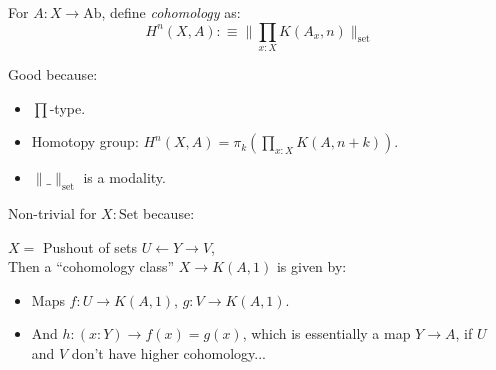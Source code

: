 \documentclass{beamer}
\begin{document}
\begin{frame}
  \vspace{0.25cm}
  For $A : X \to \mathrm{Ab}$, define \emph{cohomology} as:
  \[ H^n(X, A) :\equiv \Big\| \prod_{x:X}K(A_x,n) \Big\|_{\mathrm{set}} \]
  
  \pause
  Good because:
  \begin{itemize}
  \item $\prod$-type.
  \item Homotopy group: $H^n(X,A)=\pi_{k}(\prod_{x:X}K(A,n+k))$.
  \item $\|\_\|_{\mathrm{set}}$ is a modality.
  \end{itemize}

  \pause
  Non-trivial for $X:\mathrm{Set}$ because:

  $X=$ Pushout of sets $U\leftarrow Y\to V$, \\
  Then a ``cohomology class'' $X\to K(A,1)$ is given by:
  \begin{itemize}
  \item Maps $f:U\to K(A,1)$, $g:V\to K(A,1)$.
  \item And $h:(x:Y)\to f(x)=g(x)$, which is essentially a map $Y\to A$,
    if $U$ and $V$ don't have higher cohomology...
  \end{itemize}
\end{frame}


\end{document}
